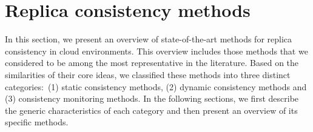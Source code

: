 \section{Replica consistency methods}

In this section, we present an overview of state-of-the-art methods for {\al replica} consistency in cloud environments. This overview includes those methods that we considered to be among the most representative in the literature.
Based on the similarities of their core ideas, we classified these %
methods into three distinct categories:~(1) static consistency methods, (2) dynamic consistency methods and (3) consistency monitoring methods. In the following sections, we first describe the generic characteristics of each category and then present an overview of its specific methods.

